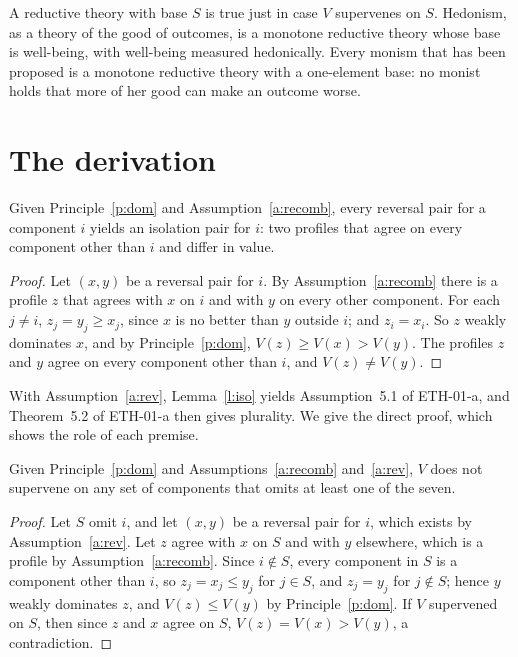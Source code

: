 \documentclass{situationist-preprint}
\begin{document}
A reductive theory with base $S$ is true just in case $V$ supervenes on $S$. Hedonism, as a theory of the good of outcomes, is a monotone reductive theory whose base is well-being, with well-being measured hedonically. Every monism that has been proposed is a monotone reductive theory with a one-element base: no monist holds that more of her good can make an outcome worse.

\section{The derivation}\label{s:deriv}

\begin{lemma}\label{l:iso}
Given Principle~\ref{p:dom} and Assumption~\ref{a:recomb}, every reversal pair for a component $i$ yields an isolation pair for $i$: two profiles that agree on every component other than $i$ and differ in value.
\end{lemma}

\begin{proof}
Let $(x, y)$ be a reversal pair for $i$. By Assumption~\ref{a:recomb} there is a profile $z$ that agrees with $x$ on $i$ and with $y$ on every other component. For each $j \neq i$, $z_j = y_j \geq x_j$, since $x$ is no better than $y$ outside $i$; and $z_i = x_i$. So $z$ weakly dominates $x$, and by Principle~\ref{p:dom}, $V(z) \geq V(x) > V(y)$. The profiles $z$ and $y$ agree on every component other than $i$, and $V(z) \neq V(y)$.
\end{proof}

With Assumption~\ref{a:rev}, Lemma~\ref{l:iso} yields Assumption~5.1 of ETH-01-a, and Theorem~5.2 of ETH-01-a then gives plurality. We give the direct proof, which shows the role of each premise.

\begin{theorem}\label{t:plural}
Given Principle~\ref{p:dom} and Assumptions~\ref{a:recomb} and~\ref{a:rev}, $V$ does not supervene on any set of components that omits at least one of the seven.
\end{theorem}

\begin{proof}
Let $S$ omit $i$, and let $(x, y)$ be a reversal pair for $i$, which exists by Assumption~\ref{a:rev}. Let $z$ agree with $x$ on $S$ and with $y$ elsewhere, which is a profile by Assumption~\ref{a:recomb}. Since $i \notin S$, every component in $S$ is a component other than $i$, so $z_j = x_j \leq y_j$ for $j \in S$, and $z_j = y_j$ for $j \notin S$; hence $y$ weakly dominates $z$, and $V(z) \leq V(y)$ by Principle~\ref{p:dom}. If $V$ supervened on $S$, then since $z$ and $x$ agree on $S$, $V(z) = V(x) > V(y)$, a contradiction.
\end{proof}
\end{document}
